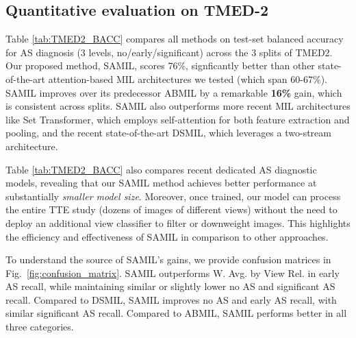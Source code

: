 


\subsection{Quantitative evaluation on TMED-2}
Table \ref{tab:TMED2_BACC} compares all methods on test-set balanced accuracy for AS diagnosis (3 levels, no/early/significant) across the 3 splits of TMED2.
Our proposed method, SAMIL, scores 76\%, signficantly better than other state-of-the-art attention-based MIL architectures we tested (which span 60-67\%). 
SAMIL improves over its predecessor ABMIL by a remarkable \textbf{16\%} gain, 
which is consistent across splits.
SAMIL also outperforms more recent MIL architectures like Set Transformer, which employs self-attention for both feature extraction and pooling, and the recent state-of-the-art DSMIL, which leverages a two-stream architecture. 

Table \ref{tab:TMED2_BACC} also compares recent dedicated AS diagnostic models, revealing that our SAMIL method achieves better performance at substantially \emph{smaller model size}. Moreover, once trained, our model can process the entire TTE study (dozens of images of different views) without the need to deploy an additional view classifier to filter \citep{holste2022automated,holste2022self} or downweight \citep{wessler2023automated} images. This highlights the efficiency and effectiveness of SAMIL in comparison to other approaches.

To understand the source of SAMIL's gains, we provide confusion matrices in Fig.~\ref{fig:confusion_matrix}.
SAMIL outperforms W. Avg. by View Rel. in early AS recall, while maintaining similar or slightly lower no AS and significant AS recall. Compared to DSMIL, SAMIL improves no AS and early AS recall, with similar significant AS recall. Compared to ABMIL, SAMIL performs better in all three categories.

